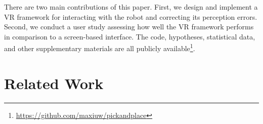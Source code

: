 \documentclass[letterpaper, 10 pt, conference]{ieeeconf}  %
\begin{document}
There are two main contributions of this paper. First, we design and implement a VR framework for interacting with the robot and correcting its perception errors. Second, we conduct a user study assessing how well the VR framework performs in comparison to a screen-based interface. The code, hypotheses, statistical data, and other supplementary materials are all publicly available\footnote{\url{https://github.com/maxiuw/pickandplace}\label{foot:projectlink}}.





\section{Related Work}
\end{document}
